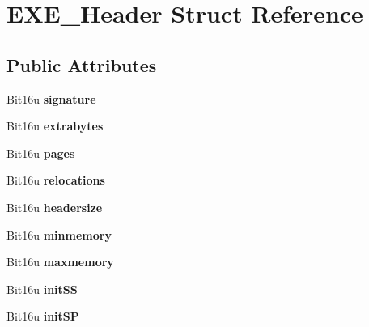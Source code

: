 \hypertarget{structEXE__Header}{\section{E\-X\-E\-\_\-\-Header Struct Reference}
\label{structEXE__Header}
}
\subsection*{Public Attributes}
\begin{DoxyCompactItemize}
\item 
\hypertarget{structEXE__Header_a6fbe1208e51eb423f774401df5d48aa3}{Bit16u {\bfseries signature}}\label{structEXE__Header_a6fbe1208e51eb423f774401df5d48aa3}

\item 
\hypertarget{structEXE__Header_a794f1adc9a899368c3c683fffd4e3610}{Bit16u {\bfseries extrabytes}}\label{structEXE__Header_a794f1adc9a899368c3c683fffd4e3610}

\item 
\hypertarget{structEXE__Header_a31d064b586d87b07d58c34e7704a7185}{Bit16u {\bfseries pages}}\label{structEXE__Header_a31d064b586d87b07d58c34e7704a7185}

\item 
\hypertarget{structEXE__Header_ab12a5a364c94c44344051f01cd3a6677}{Bit16u {\bfseries relocations}}\label{structEXE__Header_ab12a5a364c94c44344051f01cd3a6677}

\item 
\hypertarget{structEXE__Header_a9626009f3882760a55fdaa205913474b}{Bit16u {\bfseries headersize}}\label{structEXE__Header_a9626009f3882760a55fdaa205913474b}

\item 
\hypertarget{structEXE__Header_a27fd40a19e40fc7fc938f6ceff6c519f}{Bit16u {\bfseries minmemory}}\label{structEXE__Header_a27fd40a19e40fc7fc938f6ceff6c519f}

\item 
\hypertarget{structEXE__Header_af62647195b44f17feb7c120351f66ad6}{Bit16u {\bfseries maxmemory}}\label{structEXE__Header_af62647195b44f17feb7c120351f66ad6}

\item 
\hypertarget{structEXE__Header_acc8ece6c5db41a70c9a2df04c2932e60}{Bit16u {\bfseries init\-S\-S}}\label{structEXE__Header_acc8ece6c5db41a70c9a2df04c2932e60}

\item 
\hypertarget{structEXE__Header_a178371343a85309837ac203bd4ad1351}{Bit16u {\bfseries init\-S\-P}}\label{structEXE__Header_a178371343a85309837ac203bd4ad1351}


\end{DoxyCompactItemize}
